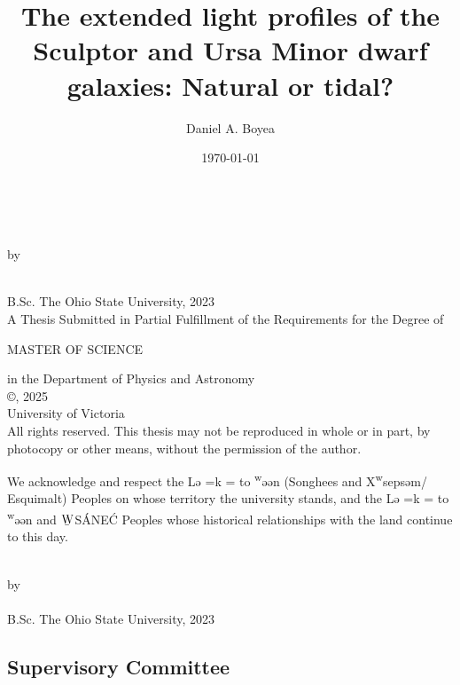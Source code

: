 \documentclass[12pt,oneside,letterpaper]{report}
\title{
    The extended light profiles of the Sculptor and Ursa Minor dwarf galaxies: Natural or tidal?
}
\author{Daniel A. Boyea}
\date{\today}
\newcommand{\schwa}{ə}
\newcommand{\Lekwnen}{L\schwa{}\overcomma{k}\textsuperscript{w}\schwa{}\ng{}\schwa{}n}
\newcommand{\skipline}{\vspace{\baselineskip}}
\def\overcomma#1{%
  \setbox0=\hbox{#1}%
  \dimen0=\wd0       %
  \vbox{%
    \hbox to \dimen0{\hfil,\hfil}%
    \nointerlineskip            %
    \box0                       %
  }%
}
\begin{document}


\makeatletter
\begin{titlepage}
   \begin{center}
       \textbf{\large \@title}\\
        \skipline

        by\\
        \skipline

       \@author\\
       B.Sc. The Ohio State University, 2023\\
       \vspace*{3\baselineskip}
    A Thesis Submitted in Partial Fulfillment of the Requirements for the Degree of\\
    \skipline

    MASTER OF SCIENCE \\
    \skipline

    in the Department of Physics and Astronomy\\
       \vfill
       {\small
       ©\@author, 2025\\
       University of Victoria\\
   }
   \skipline
       {\small
       All rights reserved. This thesis may not be reproduced in whole or in part,
   by photocopy or other means, without the permission of the author.} \\
\skipline
   \end{center}
We acknowledge and respect the \Lekwnen{} (Songhees and X\textsuperscript{w}seps\schwa{}m/
Esquimalt) Peoples on whose territory the university stands, and the
\Lekwnen{} and ${\underaccent{\bar}{\rm W}}$S\'ANE\'C Peoples whose historical relationships with the
land continue to this day. 
\end{titlepage}

\addtocounter{page}{1}


\begin{centering}
\textbf{\@title}\\
\skipline
by\\
\skipline
\@author\\
B.Sc. The Ohio State University, 2023\\
\vspace*{3\baselineskip}
\end{centering}

\subsection*{Supervisory Committee}
\skipline
\end{document}

